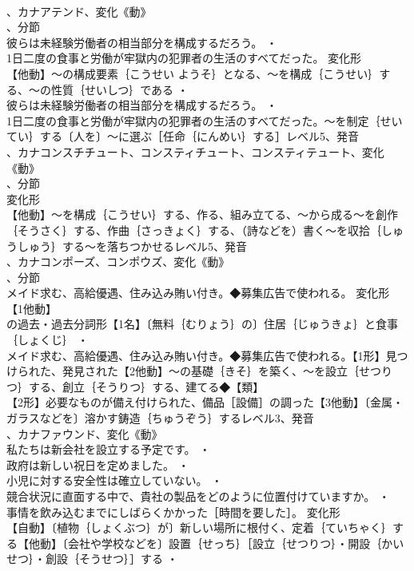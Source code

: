 \documentclass[8pt]{extreport}
\begin{document}
\begin{CJK}{UTF8}{min}
\\	、カナアテンド、変化《動》
\\	、分節
\\	彼らは未経験労働者の相当部分を構成するだろう。 ・
\\	1日二度の食事と労働が牢獄内の犯罪者の生活のすべてだった。	変化形 
\\	【他動】～の構成要素｛こうせい ようそ｝となる、～を構成｛こうせい｝する、～の性質｛せいしつ｝である ・
\\	彼らは未経験労働者の相当部分を構成するだろう。 ・
\\	1日二度の食事と労働が牢獄内の犯罪者の生活のすべてだった。～を制定｛せいてい｝する〔人を〕～に選ぶ［任命｛にんめい｝する］レベル5、発音
\\	、カナコンスチチュート、コンスティチュート、コンスティテュート、変化《動》
\\	、分節
\\	変化形 
\\	【他動】～を構成｛こうせい｝する、作る、組み立てる、～から成る～を創作｛そうさく｝する、作曲｛さっきょく｝する、（詩などを）書く～を収拾｛しゅうしゅう｝する～を落ちつかせるレベル5、発音
\\	、カナコンポーズ、コンポウズ、変化《動》
\\	、分節
\\	メイド求む、高給優遇、住み込み賄い付き。◆募集広告で使われる。	変化形 
\\	【1他動】
\\	の過去・過去分詞形【1名】〔無料｛むりょう｝の〕住居｛じゅうきょ｝と食事｛しょくじ｝ ・
\\	メイド求む、高給優遇、住み込み賄い付き。◆募集広告で使われる。【1形】見つけられた、発見された【2他動】～の基礎｛きそ｝を築く、～を設立｛せつりつ｝する、創立｛そうりつ｝する、建てる◆【類】
\\	【2形】必要なものが備え付けられた、備品［設備］の調った【3他動】〔金属・ガラスなどを〕溶かす鋳造｛ちゅうぞう｝するレベル3、発音
\\	、カナファウンド、変化《動》
\\	私たちは新会社を設立する予定です。 ・
\\	政府は新しい祝日を定めました。 ・
\\	小児に対する安全性は確立していない。 ・
\\	競合状況に直面する中で、貴社の製品をどのように位置付けていますか。 ・
\\	事情を飲み込むまでにしばらくかかった［時間を要した］。	変化形 
\\	【自動】〔植物｛しょくぶつ｝が〕新しい場所に根付く、定着｛ていちゃく｝する【他動】〔会社や学校などを〕設置｛せっち｝［設立｛せつりつ｝・開設｛かいせつ｝・創設｛そうせつ｝］する ・

\end{CJK}
\end{document}
